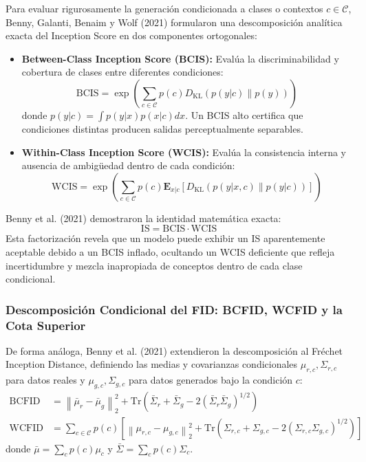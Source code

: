 Para evaluar rigurosamente la generación condicionada a clases o contextos $c \in \mathcal{C}$, Benny, Galanti, Benaim y Wolf (2021) formularon una descomposición analítica exacta del Inception Score en dos componentes ortogonales:
\begin{itemize}
    \item \textbf{Between-Class Inception Score (BCIS):} Evalúa la discriminabilidad y cobertura de clases entre diferentes condiciones:
    \begin{equation}
    \mathrm{BCIS} = \exp\left( \sum_{c \in \mathcal{C}} p(c) D_{\mathrm{KL}}(p(y|c) \parallel p(y)) \right)
    \end{equation}
    donde $p(y|c) = \int p(y|x) p(x|c) dx$. Un BCIS alto certifica que condiciones distintas producen salidas perceptualmente separables.
    \item \textbf{Within-Class Inception Score (WCIS):} Evalúa la consistencia interna y ausencia de ambigüedad dentro de cada condición:
    \begin{equation}
    \mathrm{WCIS} = \exp\left( \sum_{c \in \mathcal{C}} p(c) \mathbf{E}_{x|c} \left[ D_{\mathrm{KL}}(p(y|x, c) \parallel p(y|c)) \right] \right)
    \end{equation}
\end{itemize}

Benny et al. (2021) demostraron la identidad matemática exacta:
\begin{equation}
\mathrm{IS} = \mathrm{BCIS} \cdot \mathrm{WCIS}
\end{equation}
Esta factorización revela que un modelo puede exhibir un IS aparentemente aceptable debido a un BCIS inflado, ocultando un WCIS deficiente que refleja incertidumbre y mezcla inapropiada de conceptos dentro de cada clase condicional.

\subsubsection{Descomposición Condicional del FID: BCFID, WCFID y la Cota Superior}

De forma análoga, Benny et al. (2021) extendieron la descomposición al Fréchet Inception Distance, definiendo las medias y covarianzas condicionales $\mu_{r,c}, \Sigma_{r,c}$ para datos reales y $\mu_{g,c}, \Sigma_{g,c}$ para datos generados bajo la condición $c$:
\begin{align}
\mathrm{BCFID} &= \left\| \bar{\mu}_r - \bar{\mu}_g \right\|_2^2 + \mathrm{Tr}\left( \bar{\Sigma}_r + \bar{\Sigma}_g - 2(\bar{\Sigma}_r \bar{\Sigma}_g)^{1/2} \right) \\[0.2cm]
\mathrm{WCFID} &= \sum_{c \in \mathcal{C}} p(c) \left[ \left\| \mu_{r,c} - \mu_{g,c} \right\|_2^2 + \mathrm{Tr}\left( \Sigma_{r,c} + \Sigma_{g,c} - 2(\Sigma_{r,c} \Sigma_{g,c})^{1/2} \right) \right]
\end{align}
donde $\bar{\mu} = \sum_c p(c) \mu_c$ y $\bar{\Sigma} = \sum_c p(c) \Sigma_c$.

